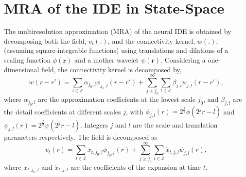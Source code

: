 \documentclass[journal,a4paper]{IEEEtran}
\begin{document}
\section{MRA of the IDE in State-Space}
The multiresolution approximation (MRA) of the neural IDE is obtained by decomposing both the field, $v_t(.)$, and the connectivity kernel, $w(.)$, (assuming square-integrable functions) using translations and dilations of a scaling function $\phi(\mathbf{r})$ and a mother wavelet $\psi(\mathbf{r})$. Considering a one-dimensional field, the connectivity kernel is decomposed by,
\begin{equation}
 w\left(r-r'\right)=\sum_{l \in \mathbb{Z}}\alpha_{j_0,l}\phi_{j_0,l}\left(r-r'\right)+\sum_{j\geq j_0}^{\infty} \sum_{l \in \mathbb{Z}}\beta_{j,l}\psi_{j,l}\left(r-r'\right), 
\label{eq:KernelExpansion}
\end{equation}
where $\alpha_{j_0,l}$ are the approximation coefficients at the lowest scale $j_0$, and $\beta_{j,l}$ are the detail coefficients at different scales $j$, with $\phi_{j,l}\left(r\right)=2^{\frac{j}{2}}\phi\left(2^jr-l\right) $ and $\psi_{j,l}\left(r\right)=2^{\frac{j}{2}}\psi\left(2^jr-l\right)$. Integers $j$ and $l$ are the scale and translation parameters respectively. The field is decomposed as
\begin{equation}
 v_t\left(r\right)=\sum_{l \in \mathbb{Z}}x_{t,j_{0},l}\phi_{j_{0},l}\left(r\right)+\sum_{j\geq j_0}^{\infty} \sum_{l \in \mathbb{Z}} \check{x}_{t,j,l}\psi_{j,l}\left(r\right),
\label{eq:FieldExpansion}
\end{equation}
where $ x_{t,j_{0},l}$ and $\check{x}_{t,j,l} $ are the coefficients of the expansion at time $t$.
\end{document}
